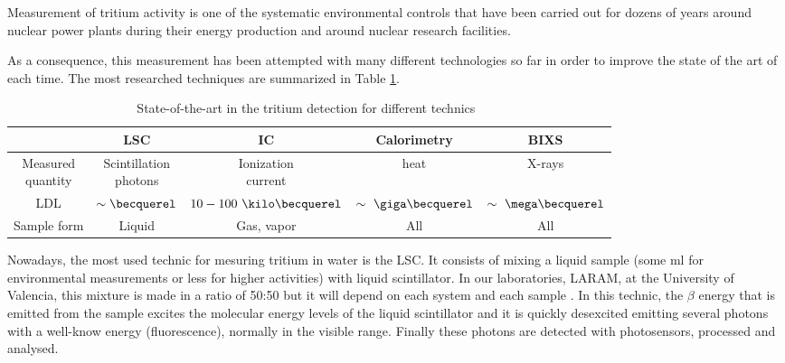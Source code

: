 Measurement of tritium activity is one of the systematic environmental controls that have been carried out for dozens of years around nuclear power plants during their energy production and around nuclear research facilities.

As a consequence, this measurement has been attempted with many different technologies so far in order to improve the state of the art of each time. The most researched techniques are summarized in Table \ref{tab:DifferentThecnics}.

\begin{table}[htbp]
\begin{center}
\begin{tabular}{|c|c|c|c|c|}
\hline
 & LSC & IC & Calorimetry & BIXS\\
\hline \hline \hline
\parbox{5em}{\centering Measured\\ quantity} & \parbox{5em}{\centering Scintillation\\ photons} &  \parbox{5em}{\centering Ionization\\ current} & heat & X-rays\\ \hline
LDL & $\sim\becquerel$ & $10-100~\kilo\becquerel$ & $\sim~\giga\becquerel$ & $\sim~\mega\becquerel$ \\ \hline
Sample form & Liquid & Gas, vapor & All & All \\ \hline
\end{tabular}
\caption{State-of-the-art in the tritium detection for different technics~\cite{TesisTritio}}
\label{tab:DifferentThecnics}
\end{center}
\end{table}

Nowadays, the most used technic for mesuring tritium in water is the LSC. It consists of mixing a liquid sample (some ml for environmental measurements or less for higher activities) with liquid scintillator. In our laboratories, LARAM, at the University of Valencia, this mixture is made in a ratio of 50:50 \cite{LSCLARAM} but it will depend on each system and each sample \cite{LSCothers} \cite{HofstetterSeveral}. In this technic, the $\beta$ energy that is emitted from the sample excites the molecular energy levels of the liquid scintillator and it is quickly desexcited emitting several photons with a well-know energy (fluorescence), normally in the visible range. Finally these photons are detected with photosensors, processed and analysed.


